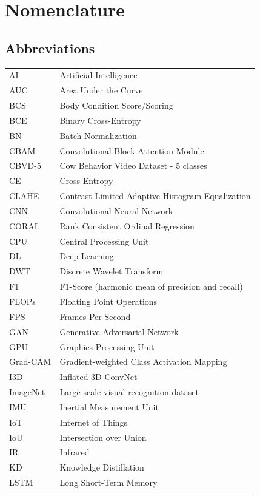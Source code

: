 \chapter*{Nomenclature}

\section*{Abbreviations}

\begin{longtable}{ll}
AI & Artificial Intelligence \\
AUC & Area Under the Curve \\
BCS & Body Condition Score/Scoring \\
BCE & Binary Cross-Entropy \\
BN & Batch Normalization \\
CBAM & Convolutional Block Attention Module \\
CBVD-5 & Cow Behavior Video Dataset - 5 classes \\
CE & Cross-Entropy \\
CLAHE & Contrast Limited Adaptive Histogram Equalization \\
CNN & Convolutional Neural Network \\
CORAL & Rank Consistent Ordinal Regression \\
CPU & Central Processing Unit \\
DL & Deep Learning \\
DWT & Discrete Wavelet Transform \\
F1 & F1-Score (harmonic mean of precision and recall) \\
FLOPs & Floating Point Operations \\
FPS & Frames Per Second \\
GAN & Generative Adversarial Network \\
GPU & Graphics Processing Unit \\
Grad-CAM & Gradient-weighted Class Activation Mapping \\
I3D & Inflated 3D ConvNet \\
ImageNet & Large-scale visual recognition dataset \\
IMU & Inertial Measurement Unit \\
IoT & Internet of Things \\
IoU & Intersection over Union \\
IR & Infrared \\
KD & Knowledge Distillation \\
LSTM & Long Short-Term Memory \\

\end{longtable}
